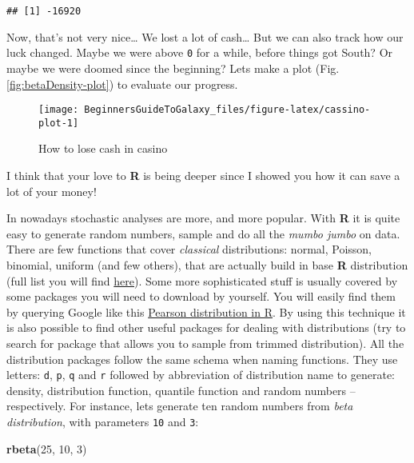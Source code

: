 \documentclass[]{book}
\newenvironment{Shaded}{\begin{snugshade}}{\end{snugshade}}
\newcommand{\KeywordTok}[1]{\textcolor[rgb]{0.13,0.29,0.53}{\textbf{#1}}}
\newcommand{\DecValTok}[1]{\textcolor[rgb]{0.00,0.00,0.81}{#1}}
\newcommand{\NormalTok}[1]{#1}
\theoremstyle{definition}
\theoremstyle{definition}
\theoremstyle{definition}
\theoremstyle{remark}
\begin{document}
\begin{verbatim}
## [1] -16920
\end{verbatim}

Now, that's not very nice\ldots{} We lost a lot of cash\ldots{} But we
can also track how our luck changed. Maybe we were above \texttt{0} for
a while, before things got South? Or maybe we were doomed since the
beginning? Lets make a plot (Fig. \ref{fig:betaDensity-plot}) to
evaluate our progress.

\begin{figure}

{\centering \texttt{[image: BeginnersGuideToGalaxy\_files/figure-latex/cassino-plot-1]} 

}

\caption{How to lose cash in casino}\label{fig:cassino-plot}
\end{figure}

I think that your love to \textbf{R} is being deeper since I showed you
how it can save a lot of your money!

In nowadays stochastic analyses are more, and more popular. With
\textbf{R} it is quite easy to generate random numbers, sample and do
all the \emph{mumbo jumbo} on data. There are few functions that cover
\emph{classical} distributions: normal, Poisson, binomial, uniform (and
few others), that are actually build in base \textbf{R} distribution
(full list you will find
\href{https://stat.ethz.ch/R-manual/R-devel/library/stats/html/Distributions.html}{here}).
Some more sophisticated stuff is usually covered by some packages you
will need to download by yourself. You will easily find them by querying
Google like this
\href{https://www.google.com/search?client=ubuntu\&channel=fs\&q=Pearson+distribution+in+R\&ie=utf-8\&oe=utf-8\&gfe_rd=cr\&dcr=0\&ei=KTI5Ws_7LfPBXrSBr7gO}{Pearson
distribution in R}. By using this technique it is also possible to find
other useful packages for dealing with distributions (try to search for
package that allows you to sample from trimmed distribution). All the
distribution packages follow the same schema when naming functions. They
use letters: \texttt{d}, \texttt{p}, \texttt{q} and \texttt{r} followed
by abbreviation of distribution name to generate: density, distribution
function, quantile function and random numbers -- respectively. For
instance, lets generate ten random numbers from \emph{beta
distribution}, with parameters \texttt{10} and \texttt{3}:

\begin{Shaded}
\begin{Highlighting}[]
\KeywordTok{rbeta}\NormalTok{(}\DecValTok{25}\NormalTok{, }\DecValTok{10}\NormalTok{, }\DecValTok{3}\NormalTok{)}
\end{Highlighting}
\end{Shaded}
\end{document}
